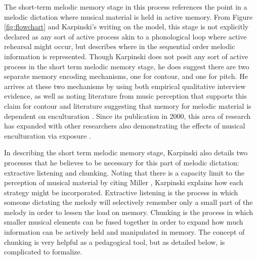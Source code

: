 \documentclass[12pt,]{book}
\begin{document}
The short-term melodic memory stage in this process references the point in a melodic dictation where musical material is held in active memory.
From Figure \ref{fig:flowchart} and Karpinski's writing on the model, this stage is not explicitly declared as any sort of active process akin to a phonological loop \citep{baddeleyEpisodicBufferNew2000} where active rehearsal might occur, but describes where in the sequential order melodic information is represented.
Though Karpinski does not posit any sort of active process in the short term melodic memory stage, he does suggest there are two separate memory encoding mechanisms, one for contour, and one for pitch.
He arrives at these two mechanisms by using both empirical qualitative interview evidence, as well as noting literature from music perception that supports this claim for contour \citep{dowlingScaleContourTwo1978, dewittRecognitionNovelMelodies1986} and literature suggesting that memory for melodic material is dependent on enculturation \citep{ouraMemoryMelodiesSubjects1988, handelListeningIntroductionPerception1989, dowlingExpectancyAttentionMelody1990}.
Since its publication in 2000, this area of research has expanded with other researchers also demonstrating the effects of musical enculturation via exposure \citep{eerolaExpectancySamiYoiks2009, stevensMusicPerceptionCognition2012, pearceAuditoryExpectationInformation2012, pearceStatisticalLearningProbabilistic2018a}.

In describing the short term melodic memory stage, Karpinski also details two processes that he believes to be necessary for this part of melodic dictation: extractive listening and chunking.
Noting that there is a capacity limit to the perception of musical material by citing Miller \citeyearpar{millerMagicalNumberSeven1956}, Karpinski explains how each strategy might be incorporated.
Extractive listening is the process in which someone dictating the melody will selectively remember only a small part of the melody in order to lessen the load on memory.
Chunking is the process in which smaller musical elements can be fused together in order to expand how much information can be actively held and manipulated in memory.
The concept of chunking is very helpful as a pedagogical tool, but as detailed below, is complicated to formalize.
\end{document}
